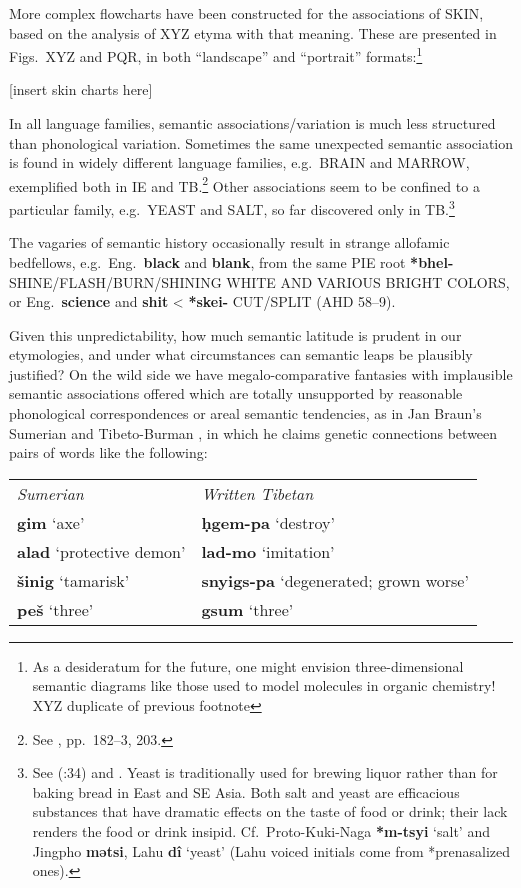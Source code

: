 More complex flowcharts have been constructed for the associations of SKIN, based on the analysis of XYZ etyma with that meaning. These are presented in Figs.~XYZ and PQR, in both “landscape” and “portrait” formats:\footnote{As a desideratum for the future, one might envision three-dimensional semantic diagrams like those used to model molecules in organic chemistry! XYZ duplicate of previous footnote}

[insert skin charts here]

In all language families, semantic associations/variation is much less structured than phonological variation. Sometimes the same unexpected semantic association is found in widely different language families, e.g.\ BRAIN and MARROW, exemplified both in IE and TB.\footnote{See \textit{}, pp.~182–3, 203.} Other associations seem to be confined to a particular family, e.g.\ YEAST and SALT, so far discovered only in TB.\footnote{See \citealt{JAM-HPTB} (\textit{}:34) and \citeyear{JAM-OER}. Yeast is traditionally used for brewing liquor rather than for baking bread in East and SE Asia. Both salt and yeast are efficacious substances that have dramatic effects on the taste of food or drink; their lack renders the food or drink insipid. Cf.\ Proto-Kuki-Naga \textbf{*m-tsyi} ‘salt’ and Jingpho \textbf{mətsi}, Lahu \textbf{dî} ‘yeast’ (Lahu voiced initials come from *prenasalized ones).}

The vagaries of semantic history occasionally result in strange allofamic bedfellows, e.g.\ Eng.\ \textbf{black} and \textbf{blank}, from the same PIE root \textbf{*bhel-} SHINE/FLASH/BURN/SHINING WHITE AND VARIOUS BRIGHT COLORS, or Eng.\ \textbf{science} and \textbf{shit} < \textbf{*skei-} CUT/SPLIT (AHD 58–9).

Given this unpredictability, how much semantic latitude is prudent in
our etymologies, and under what circumstances can semantic leaps be
plausibly justified? On the wild side we have megalo-comparative
fantasies with implausible semantic associations offered which are
totally unsupported by reasonable phonological correspondences or
areal semantic tendencies, as in Jan Braun’s Sumerian and
Tibeto-Burman \citeyearpar{JB-STB}, in which he claims genetic connections between
pairs of words like the following:

\begin{tabular}{l l}
		\textit{Sumerian}		&		\textit{Written Tibetan}\\
		\textbf{gim} ‘axe’		&		\textbf{ḥgem-pa} ‘destroy’\\
		\textbf{alad} ‘protective demon’	&	\textbf{lad-mo} ‘imitation’\\
		\textbf{šinig} ‘tamarisk’	&		\textbf{snyigs-pa} ‘degenerated; grown worse’\\
		\textbf{peš} ‘three’	&		\textbf{gsum} ‘three’\\
\end{tabular}


